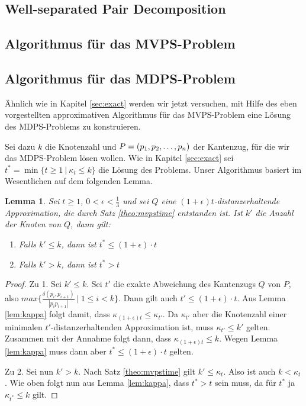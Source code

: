 \documentclass[11pt]{article}
\newtheorem{lemma}[theorem]{Lemma}
\begin{document}
    \subsection{Well-separated Pair Decomposition}
    \label{subsec:wspd}
    
    
    \subsection{Algorithmus für das MVPS-Problem}
    \label{subsec:mvps}
	
    
    \subsection{Algorithmus für das MDPS-Problem}
    \label{subsec:mdps}
	Ähnlich wie in Kapitel \ref{sec:exact} werden wir jetzt versuchen, mit Hilfe des eben vorgestellten approximativen Algorithmus für das MVPS-Problem eine Lösung des MDPS-Problems zu konstruieren.
	
	Sei dazu $k$ die Knotenzahl und $P = (p_1, p_2, \mathellipsis, p_n)$ der Kantenzug, für die wir das MDPS-Problem lösen wollen. 
	Wie in Kapitel \ref{sec:exact} sei $t^* = \min\{t \geq 1\ |\ \kappa_t \leq k\}$ die Lösung des Problems. 
	Unser Algorithmus basiert im Wesentlichen auf dem folgenden Lemma.
	
	\begin{lemma}
		\label{lem:tstar}
		Sei $t \geq 1$, $0 < \epsilon < \frac{1}{3}$ und sei $Q$ eine $(1 + \epsilon)t$-distanzerhaltende Approximation, die durch Satz \ref{theo:mvpstime} entstanden ist. Ist $k'$ die Anzahl der Knoten von $Q$, dann gilt:
		\begin{enumerate}
			\item Falls $k' \leq k$, dann ist $t^* \leq (1 + \epsilon) \cdot t$
			\item Falls $k' > k$, dann ist $t^* > t$
		\end{enumerate}
	\end{lemma}
	\begin{proof}
		Zu 1. Sei $k' \leq k$. Sei $t'$ die exakte Abweichung des Kantenzugs $Q$ von $P$, also $max\{\frac{\delta(p_i, p_{i+1})}{|p_ip_{i+1}|}\ |\ 1 \leq i < k\}$. 
		Dann gilt auch $t' \leq (1 + \epsilon) \cdot t$. 
		Aus Lemma \ref{lem:kappa} folgt damit, dass $\kappa_{(1 + \epsilon)t} \leq \kappa_{t'}$.
		Da $\kappa_{t'}$ aber die Knotenzahl einer minimalen $t'$-distanzerhaltenden Approximation ist, muss $\kappa_{t'} \leq k'$ gelten. Zusammen mit der Annahme folgt dann, dass $\kappa_{(1 + \epsilon)t} \leq k$. Wegen Lemma \ref{lem:kappa} muss dann aber $t^* \leq (1 + \epsilon) \cdot t$ gelten.
		
		Zu 2. Sei nun $k' > k$. Nach Satz \ref{theo:mvpstime} gilt $k' \leq \kappa_t$. Also ist auch $k < \kappa_t$. Wie oben folgt nun aus Lemma \ref{lem:kappa}, dass $t^* > t$ sein muss, da für $t^*$ ja $\kappa_{t^*} \leq k$ gilt.		
	\end{proof}
	
\end{document}
